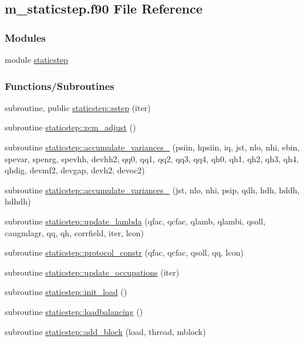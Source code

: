 \hypertarget{m__staticstep_8f90}{}\subsection{m\+\_\+staticstep.\+f90 File Reference}
\label{m__staticstep_8f90}
\subsubsection*{Modules}
\begin{DoxyCompactItemize}
\item 
module \hyperlink{namespacestaticstep}{staticstep}
\end{DoxyCompactItemize}
\subsubsection*{Functions/\+Subroutines}
\begin{DoxyCompactItemize}
\item 
subroutine, public \hyperlink{namespacestaticstep_aafbae5fcc8b88a8a4d88e7ad1e05a899}{staticstep\+::sstep} (iter)
\item 
subroutine \hyperlink{namespacestaticstep_ae2989b0c1c4604ed91faa577c40e3a4a}{staticstep\+::zcm\+\_\+adjust} ()
\item 
subroutine \hyperlink{namespacestaticstep_aaf61333300ac38c50d5890a9aff28456}{staticstep\+::accumulate\+\_\+variances\+\_} (psiin, hpsiin, iq, jst, nlo, nhi, ebin, spevar, spenrg, spevhh, devhh2, qq0, qq1, qq2, qq3, qq4, qh0, qh1, qh2, qh3, qh4, qhdig, devmf2, devgap, devh2, devoc2)
\item 
subroutine \hyperlink{namespacestaticstep_af672da037f64ebf0a4435b5af395f0e9}{staticstep\+::accumulate\+\_\+variances\+\_} (jst, nlo, nhi, psip, qdh, hdh, hddh, hdhdh)
\item 
subroutine \hyperlink{namespacestaticstep_a1117ff016ebf0853ab6d064306a22251}{staticstep\+::update\+\_\+lambda} (qfac, qcfac, qlamb, qlambi, qsoll, caugmlagr, qq, qh, corrfield, iter, lcon)
\item 
subroutine \hyperlink{namespacestaticstep_ae9ea84cc70a5ccb243884f8a667a43c7}{staticstep\+::protocol\+\_\+constr} (qfac, qcfac, qsoll, qq, lcon)
\item 
subroutine \hyperlink{namespacestaticstep_a09f0e694780bb6b797fcf5b3770af031}{staticstep\+::update\+\_\+occupations} (iter)
\item 
subroutine \hyperlink{namespacestaticstep_a748ee1b9e0178c735a49f12b9848b05c}{staticstep\+::init\+\_\+load} ()
\item 
subroutine \hyperlink{namespacestaticstep_a92e0512441559a3aa9fc1729fe02034c}{staticstep\+::loadbalancing} ()
\item 
subroutine \hyperlink{namespacestaticstep_a5f7ce9af7ea6a48e66b723c194c839e0}{staticstep\+::add\+\_\+block} (load, thread, mblock)
\end{DoxyCompactItemize}

